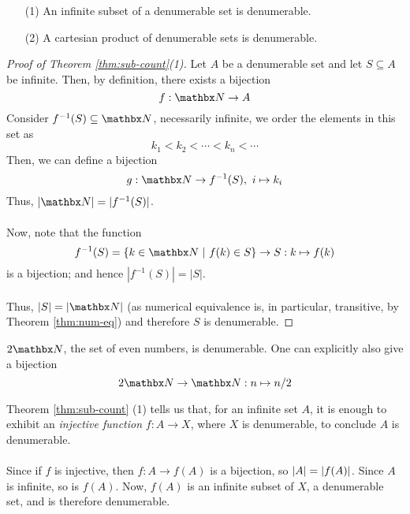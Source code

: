 \vspace*{1em}

\begin{theorem}\label{thm:sub-count}\hfill
\begin{itemize}
\item[(1)] An infinite subset of a denumerable set is denumerable.
\item[(2)] A cartesian product of denumerable sets is denumerable.
\end{itemize}
\end{theorem}
\begin{proof}[Proof of Theorem \ref{thm:sub-count}(1)]
Let $A$ be a denumerable set and let $S \subseteq A$ be infinite. Then, by definition, there exists a bijection
\[f:\nn \to A\]
Consider $f^{-1}(S) \subseteq \nn$, necessarily infinite, we order the elements in this set as 
\[k_1 < k_2 < \cdots < k_n < \cdots\]
Then, we can define a bijection
\[g:\nn \to f^{-1}(S),\ i \mapsto k_i\]
Thus, $\abs{\nn} = |f^{-1}(S)|$.\\
\\
Now, note that the function
\[f^{-1}(S) = \setp{k \in \nn}{f(k) \in S} \to S: k \mapsto f(k)\]
is a bijection; and hence $|f^{-1}(S)| = |S|$.\\
\\
Thus, $\abs{S} = \abs{\nn}$ (as numerical equivalence is, in particular, transitive, by Theorem \ref{thm:num-eq}) and therefore $S$ is denumerable.
\end{proof}

\vspace*{1em}

\begin{example}
$2\nn$, the set of even numbers, is denumerable. One can explicitly also give a bijection
\[2\nn \to \nn:n \mapsto n/2\]
\end{example}


\begin{remark}\label{rmk:inj-count}
Theorem \ref{thm:sub-count} (1) tells us that, for an infinite set $A$, it is enough to exhibit an \emph{injective function} $f:A \to X$, where $X$ is denumerable, to conclude $A$ is denumerable.\\
\\
Since if $f$ is injective, then $f:A \to f(A)$ is a bijection, so $\left\lvert A\right\rvert = \left\lvert f(A)\right\rvert$. Since $A$ is infinite, so is $f(A)$. Now, $f(A)$ is an infinite subset of $X$, a denumerable set, and is therefore denumerable.
\end{remark}


